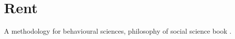 
\section{Rent}
A methodology for behavioural sciences, philosophy of social science book \cite{kaplanConductInquiryMethodology2017}.











